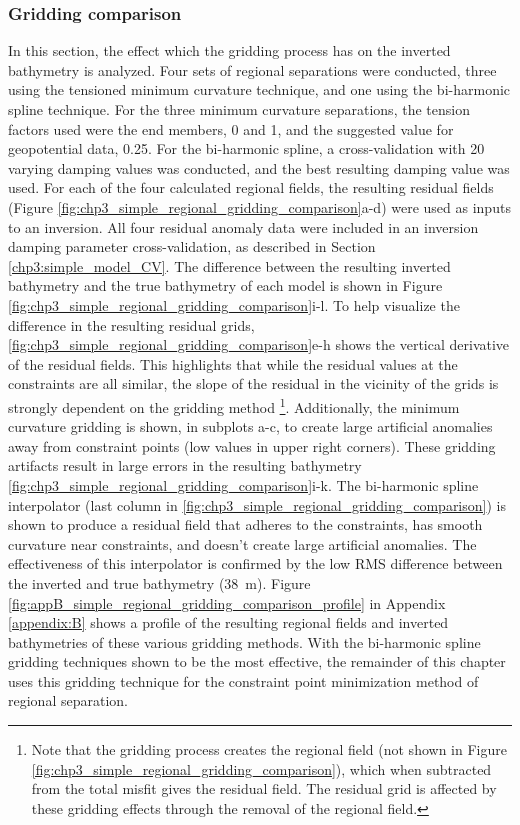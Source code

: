 \subsubsection{Gridding comparison}

In this section, the effect which the gridding process has on the inverted bathymetry is analyzed. Four sets of regional separations were conducted, three using the tensioned minimum curvature technique, and one using the bi-harmonic spline technique. For the three minimum curvature separations, the tension factors used were the end members, 0 and 1, and the suggested value for geopotential data, 0.25. For the bi-harmonic spline, a cross-validation with 20 varying damping values was conducted, and the best resulting damping value was used. For each of the four calculated regional fields, the resulting residual fields (Figure \ref{fig:chp3_simple_regional_gridding_comparison}a-d) were used as inputs to an inversion. All four residual anomaly data were included in an inversion damping parameter cross-validation, as described in Section \ref{chp3:simple_model_CV}. The difference between the resulting inverted bathymetry and the true bathymetry of each model is shown in Figure \ref{fig:chp3_simple_regional_gridding_comparison}i-l. To help visualize the difference in the resulting residual grids, \ref{fig:chp3_simple_regional_gridding_comparison}e-h shows the vertical derivative of the residual fields. This highlights that while the residual values at the constraints are all similar, the slope of the residual in the vicinity of the grids is strongly dependent on the gridding method \footnote{Note that the gridding process creates the regional field (not shown in Figure \ref{fig:chp3_simple_regional_gridding_comparison}), which when subtracted from the total misfit gives the residual field. The residual grid is affected by these gridding effects through the removal of the regional field.}. Additionally, the minimum curvature gridding is shown, in subplots a-c, to create large artificial anomalies away from constraint points (low values in upper right corners). These gridding artifacts result in large errors in the resulting bathymetry \ref{fig:chp3_simple_regional_gridding_comparison}i-k. The bi-harmonic spline interpolator (last column in \ref{fig:chp3_simple_regional_gridding_comparison}) is shown to produce a residual field that adheres to the constraints, has smooth curvature near constraints, and doesn't create large artificial anomalies. The effectiveness of this interpolator is confirmed by the low RMS difference between the inverted and true bathymetry (38~m). Figure \ref{fig:appB_simple_regional_gridding_comparison_profile} in Appendix \ref{appendix:B} shows a profile of the resulting regional fields and inverted bathymetries of these various gridding methods. With the bi-harmonic spline gridding techniques shown to be the most effective, the remainder of this chapter uses this gridding technique for the constraint point minimization method of regional separation.

